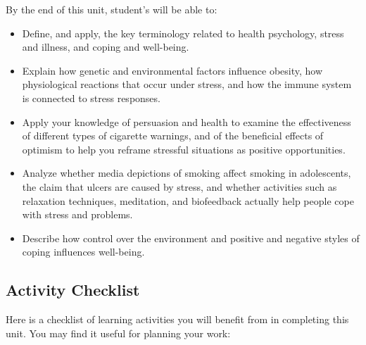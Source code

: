 \documentclass[
]{book}
\providecommand{\tightlist}{%
  \setlength{\itemsep}{0pt}\setlength{\parskip}{0pt}}
\begin{document}
By the end of this unit, student's will be able to:

\begin{itemize}
\tightlist
\item
  Define, and apply, the key terminology related to health psychology, stress and illness, and coping and well-being.\\
\item
  Explain how genetic and environmental factors influence obesity, how physiological reactions that occur under stress, and how the immune system is connected to stress responses.\\
\item
  Apply your knowledge of persuasion and health to examine the effectiveness of different types of cigarette warnings, and of the beneficial effects of optimism to help you reframe stressful situations as positive opportunities.\\
\item
  Analyze whether media depictions of smoking affect smoking in adolescents, the claim that ulcers are caused by stress, and whether activities such as relaxation techniques, meditation, and biofeedback actually help people cope with stress and problems.\\
\item
  Describe how control over the environment and positive and negative styles of coping influences well-being.
\end{itemize}

\hypertarget{activity-checklist-7}{%
\subsection*{Activity Checklist}\label{activity-checklist-7}}

Here is a checklist of learning activities you will benefit from in completing this unit. You may find it useful for planning your work:
\end{document}
